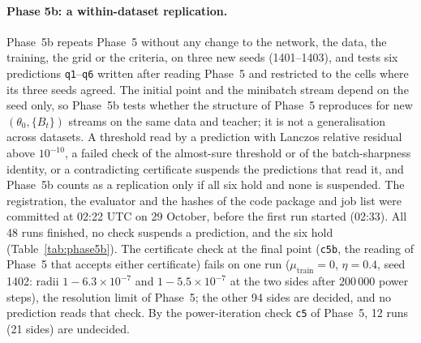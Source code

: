 \documentclass[11pt]{article}
\theoremstyle{remark}
\begin{document}
\paragraph{Phase 5b: a within-dataset replication.} Phase~5b repeats Phase~5 without any change to the network, the data, the training, the grid or the criteria, on three new seeds (1401--1403), and tests six predictions \texttt{q1}--\texttt{q6} written after reading Phase~5 and restricted to the cells where its three seeds agreed. The initial point and the minibatch stream depend on the seed only, so Phase~5b tests whether the structure of Phase~5 reproduces for new $(\theta_0,\{B_t\})$ streams on the same data and teacher; it is not a generalisation across datasets. A threshold read by a prediction with Lanczos relative residual above $10^{-10}$, a failed check of the almost-sure threshold or of the batch-sharpness identity, or a contradicting certificate suspends the predictions that read it, and Phase~5b counts as a replication only if all six hold and none is suspended. The registration, the evaluator and the hashes of the code package and job list were committed at 02:22 UTC on 29 October, before the first run started (02:33). All 48 runs finished, no check suspends a prediction, and the six hold (Table~\ref{tab:phase5b}). The certificate check at the final point (\texttt{c5b}, the reading of Phase~5 that accepts either certificate) fails on one run ($\mu_{\mathrm{train}}=0$, $\eta=0.4$, seed 1402: radii $1-6.3\times10^{-7}$ and $1-5.5\times10^{-7}$ at the two sides after $200\,000$ power steps), the resolution limit of Phase~5; the other 94 sides are decided, and no prediction reads that check. By the power-iteration check \texttt{c5} of Phase~5, 12 runs (21 sides) are undecided.
\end{document}

